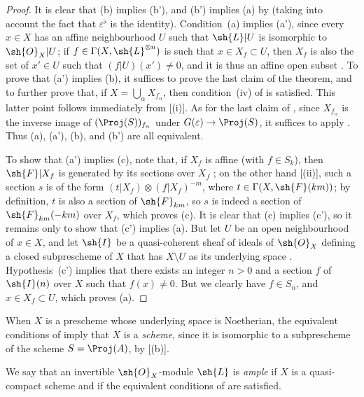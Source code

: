 \begin{proof}
  It is clear that (b) implies (b'), and (b') implies (a) by  (taking into account the fact that $\varepsilon^\flat$ is the identity).
  Condition~(a) implies (a'), since every $x\in X$ has an affine neighbourhood $U$ such that $\sh{L}|U$ is isomorphic to $\sh{O}_X|U$;
  if $f\in\Gamma(X,\sh{L}^{\otimes n})$ is such that $x\in X_f\subset U$, then $X_f$ is also the set of $x'\in U$ such that $(f|U)(x')\neq0$, and it is thus an affine open subset .
  To prove that (a') implies (b), it suffices to prove the last claim of the theorem, and to further prove that, if $X=\bigcup_\alpha X_{f_\alpha}$, then condition~(iv) of  is satisfied.
  This latter point follows immediately from [(i)].
  As for the last claim of , since $X_{f_\alpha}$ is the inverse image of $(\Proj(S))_{f_\alpha}$ under $G(\varepsilon)\to\Proj(S)$, it suffices to apply .
  Thus (a), (a'), (b), and (b') are all equivalent.

  To show that (a') implies (c), note that, if $X_f$ is affine (with $f\in S_k$), then $\sh{F}|X_f$ is generated by its sections over $X_f$ ;
  on the other hand [(ii)], such a section $s$ is of the form $(t|X_f)\otimes(f|X_f)^{-m}$, where $t\in\Gamma(X,\sh{F}(km))$;
  by definition, $t$ is also a section of $\sh{F}_{km}$, so $s$ is indeed a section of $\sh{F}_{km}(-km)$ over $X_f$, which proves (c).
  It is clear that (c) implies (c'), so it remains only to show that (c') implies (a).
  But let $U$ be an open neighbourhood of $x\in X$, and let $\sh{I}$ be a quasi-coherent sheaf of ideals of $\sh{O}_X$ defining a closed subprescheme of $X$ that has $X\setminus U$ as its underlying space .
  Hypothesis~(c') implies that there exists an integer $n>0$ and a section $f$ of $\sh{I}(n)$ over $X$ such that $f(x)\neq0$.
  But we clearly have $f\in S_n$, and $x\in X_f\subset U$, which proves (a).
\end{proof}

When $X$ is a prescheme whose underlying space is Noetherian, the equivalent conditions of  imply that $X$ is a \emph{scheme}, since it is isomorphic to a subprescheme of the scheme $S=\Proj(A)$, by [(b)].

\begin{definition}[4.5.3]
\label{II.4.5.3}
We say that an invertible $\sh{O}_X$-module $\sh{L}$ is \emph{ample} if $X$ is a quasi-compact scheme and if the equivalent conditions of  are satisfied.
\end{definition}

